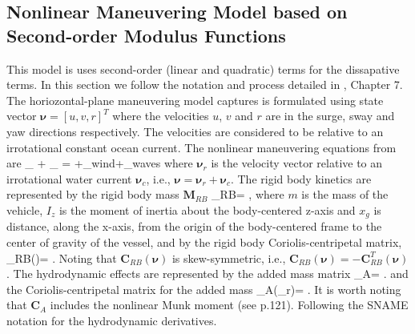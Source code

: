 \documentclass[11pt,draftcls,journal,onecolumn]{../latexlib/latex_ieee/IEEEtran}
\begin{document}
\subsection{Nonlinear Maneuvering Model based on Second-order Modulus Functions}
This model is uses second-order (linear and quadratic) terms for the dissapative terms. In this section we follow the notation and process detailed in \cite{fossen11handbook}, Chapter 7. The horiozontal-plane maneuvering model captures is formulated using state vector $\bm{\nu}=[u,v,r]^T$ where the velocities $u$, $v$ and $r$ are in the surge, sway and yaw directions respectively.  The velocities are considered to be relative to an irrotational constant ocean current.  The nonlinear maneuvering equations from \cite{fossen11handbook} are
\beqn
{}_ +
_
= \bm{\tau}+\bm{\tau}_{wind}+\bm{\tau}_{waves}
\eeqn
where $\bm{\nu}_r$ is the velocity vector relative to an irrotational water current $\bm{\nu}_c$, i.e., $\bm{\nu}=\bm{\nu}_r+\bm{\nu}_c$.  The rigid body kinetics are represented by the rigid body mass $\bm{M}_{RB}$ 
\beqn
{}_{RB}= ,
\eeqn
where $m$ is the mass of the vehicle, $I_z$ is the moment of inertia about the body-centered z-axis and $x_g$ is distance, along the x-axis, from the origin of the body-centered frame to the center of gravity of the vessel, and by the rigid body Coriolis-centripetal matrix,
\beqn
{}_{RB}(\bm{\nu})= .
\eeqn
Noting that $\bm{C}_{RB}(\bm{\nu})$ is skew-symmetric, i.e., $\bm{C}_{RB}(\bm{\nu})=-\bm{C}_{RB}^T(\bm{\nu})$.  The hydrodynamic effects are represented by the added mass matrix
\beqn
{}_{A}= .
\eeqn
and the Coriolis-centripetal matrix for the added mass
\beqn
{}_{A}(\bm{\nu}_r)= .
\eeqn
It is worth noting that $\bm{C}_A$ includes the nonlinear Munk moment (see \cite{fossen11handbook} p.121).  Following \cite{fossen11handbook} the SNAME notation for the hydrodynamic derivatives.
\end{document}
